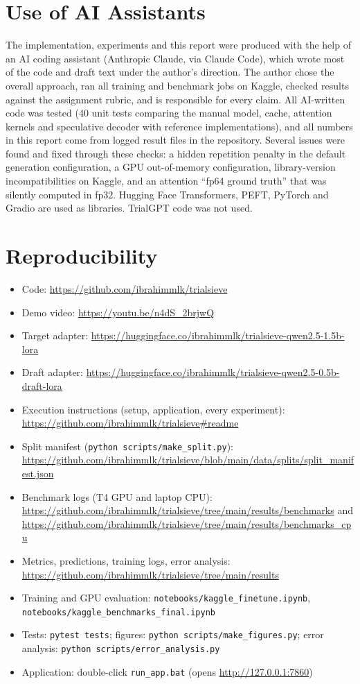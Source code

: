 \documentclass[conference]{IEEEtran}
\newcommand{\code}[1]{\texttt{\small #1}}
\begin{document}
\balance



\appendices
\section{Use of AI Assistants}
The implementation, experiments and this report were produced with the help of an AI coding assistant (Anthropic Claude, via Claude Code), which wrote most of the code and draft text under the author's direction. The author chose the overall approach, ran all training and benchmark jobs on Kaggle, checked results against the assignment rubric, and is responsible for every claim. All AI-written code was tested (40 unit tests comparing the manual model, cache, attention kernels and speculative decoder with reference implementations), and all numbers in this report come from logged result files in the repository. Several issues were found and fixed through these checks: a hidden repetition penalty in the default generation configuration, a GPU out-of-memory configuration, library-version incompatibilities on Kaggle, and an attention ``fp64 ground truth'' that was silently computed in fp32. Hugging Face Transformers, PEFT, PyTorch and Gradio are used as libraries. TrialGPT code was not used.

\section{Reproducibility}
{\raggedright\footnotesize
\begin{itemize}
\item Code: \url{https://github.com/ibrahimmlk/trialsieve}
\item Demo video: \url{https://youtu.be/n4dS_2brjwQ}
\item Target adapter: \url{https://huggingface.co/ibrahimmlk/trialsieve-qwen2.5-1.5b-lora}
\item Draft adapter: \url{https://huggingface.co/ibrahimmlk/trialsieve-qwen2.5-0.5b-draft-lora}
\item Execution instructions (setup, application, every experiment): \url{https://github.com/ibrahimmlk/trialsieve#readme}
\item Split manifest (\code{python scripts/make\_split.py}): \url{https://github.com/ibrahimmlk/trialsieve/blob/main/data/splits/split_manifest.json}
\item Benchmark logs (T4 GPU and laptop CPU): \url{https://github.com/ibrahimmlk/trialsieve/tree/main/results/benchmarks} and \url{https://github.com/ibrahimmlk/trialsieve/tree/main/results/benchmarks_cpu}
\item Metrics, predictions, training logs, error analysis: \url{https://github.com/ibrahimmlk/trialsieve/tree/main/results}
\item Training and GPU evaluation: \code{notebooks/kaggle\_finetune.ipynb}, \code{notebooks/kaggle\_benchmarks\_final.ipynb}
\item Tests: \code{pytest tests}; figures: \code{python scripts/make\_figures.py}; error analysis: \code{python scripts/error\_analysis.py}
\item Application: double-click \code{run\_app.bat} (opens \url{http://127.0.0.1:7860})
\end{itemize}}
\end{document}
